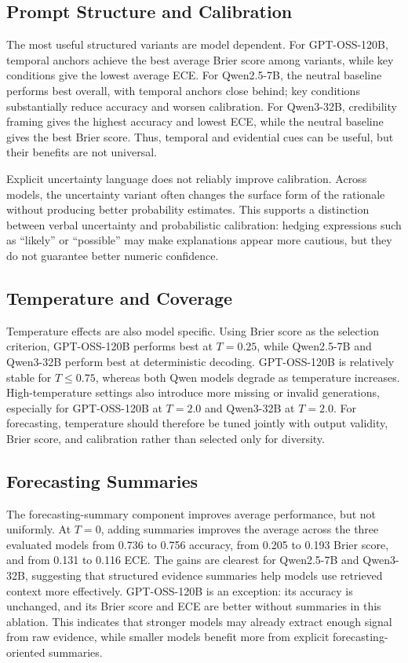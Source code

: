 \documentclass[11pt]{article}
\begin{document}
\subsection{Prompt Structure and Calibration}

The most useful structured variants are model dependent.
For GPT-OSS-120B, temporal anchors achieve the best average Brier score among variants, while key conditions give the lowest average ECE.
For Qwen2.5-7B, the neutral baseline performs best overall, with temporal anchors close behind; key conditions substantially reduce accuracy and worsen calibration.
For Qwen3-32B, credibility framing gives the highest accuracy and lowest ECE, while the neutral baseline gives the best Brier score.
Thus, temporal and evidential cues can be useful, but their benefits are not universal.

Explicit uncertainty language does not reliably improve calibration.
Across models, the uncertainty variant often changes the surface form of the rationale without producing better probability estimates.
This supports a distinction between verbal uncertainty and probabilistic calibration: hedging expressions such as ``likely'' or ``possible'' may make explanations appear more cautious, but they do not guarantee better numeric confidence.

\subsection{Temperature and Coverage}

Temperature effects are also model specific.
Using Brier score as the selection criterion, GPT-OSS-120B performs best at $T=0.25$, while Qwen2.5-7B and Qwen3-32B perform best at deterministic decoding.
GPT-OSS-120B is relatively stable for $T \leq 0.75$, whereas both Qwen models degrade as temperature increases.
High-temperature settings also introduce more missing or invalid generations, especially for GPT-OSS-120B at $T=2.0$ and Qwen3-32B at $T=2.0$.
For forecasting, temperature should therefore be tuned jointly with output validity, Brier score, and calibration rather than selected only for diversity.

\subsection{Forecasting Summaries}

The forecasting-summary component improves average performance, but not uniformly.
At $T=0$, adding summaries improves the average across the three evaluated models from 0.736 to 0.756 accuracy, from 0.205 to 0.193 Brier score, and from 0.131 to 0.116 ECE.
The gains are clearest for Qwen2.5-7B and Qwen3-32B, suggesting that structured evidence summaries help models use retrieved context more effectively.
GPT-OSS-120B is an exception: its accuracy is unchanged, and its Brier score and ECE are better without summaries in this ablation.
This indicates that stronger models may already extract enough signal from raw evidence, while smaller models benefit more from explicit forecasting-oriented summaries.
\end{document}
